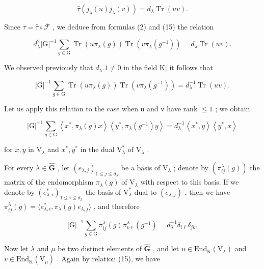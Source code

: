 \[
\hat {\tau} (j _ {\lambda} (u) j _ {\lambda} (v)) = d _ {\lambda} \operatorname{Tr} (u v).
\]

Since \(\tau = \hat{\tau} \circ \overline{\mathcal{F}}\) , we deduce from formulas (2) and (15) the relation

\[
d _ {\lambda} ^ {2} | \mathrm{G} | ^ {- 1} \sum_ {g \in \mathrm{G}} \operatorname{Tr} (u \pi_ {\lambda} (g)) \operatorname{Tr} (v \pi_ {\lambda} (g ^ {- 1})) = d _ {\lambda} \operatorname{Tr} (u v).
\]

We observed previously that \(d_{\lambda}.1 \neq 0\) in the field K; it follows that

\[
| \mathrm{G} | ^ {- 1} \sum_ {g \in \mathrm{G}} \operatorname{Tr} (u \pi_ {\lambda} (g)) \operatorname{Tr} (v \pi_ {\lambda} (g ^ {- 1})) = d _ {\lambda} ^ {- 1} \operatorname{Tr} (u v).\tag{20}
\]

Let us apply this relation to the case when u and v have rank \(\leqslant 1\) ; we obtain

\[
| \mathrm{G} | ^ {- 1} \sum_ {g \in \mathrm{G}} \left\langle x ^ {*}, \pi_ {\lambda} (g) x \right\rangle \left\langle y ^ {*}, \pi_ {\lambda} \left(g ^ {- 1}\right) y \right\rangle = d _ {\lambda} ^ {- 1} \left\langle x ^ {*}, y \right\rangle \left\langle y ^ {*}, x \right\rangle\tag{21}
\]

for \(x, y\) in \(\mathrm{V}_{\lambda}\) and \(x^{*}, y^{*}\) in the dual \(\mathrm{V}_{\lambda}^{*}\) of \(\mathrm{V}_{\lambda}\) .

For every \(\lambda \in \widehat{\mathbf{G}}\) , let \((e_{\lambda,j})_{1\leqslant j\leqslant d_{\lambda}}\) be a basis of \(\mathrm{V}_{\lambda}\) ; denote by \((\pi_{ij}^{\lambda}(g))\) the matrix of the endomorphism \(\pi_{\lambda}(g)\) of \(\mathrm{V}_{\lambda}\) with respect to this basis. If we denote by \((e_{\lambda,i}^{*})_{1\leqslant i\leqslant d_{\lambda}}\) the basis of \(\mathrm{V}_{\lambda}^{*}\) dual to \((e_{\lambda,j})\) , then we have \(\pi_{ij}^{\lambda}(g) = \langle e_{\lambda,i}^{*}, \pi_{\lambda}(g)e_{\lambda,j}\rangle\) , and therefore

\[
| \mathrm{G} | ^ {- 1} \sum_ {g \in \mathrm{G}} \pi_ {i j} ^ {\lambda} (g) \pi_ {k \ell} ^ {\lambda} (g ^ {- 1}) = d _ {\lambda} ^ {- 1} \delta_ {i \ell} \delta_ {j k}.\tag{22}
\]

Now let \(\lambda\) and \(\mu\) be two distinct elements of \(\widehat{\mathbf{G}}\) , and let \(u \in \mathrm{End}_{\mathrm{K}}(\mathrm{V}_{\lambda})\) and \(v \in \mathrm{End}_{\mathrm{K}}(\mathrm{V}_{\mu})\) . Again by relation (15), we have

